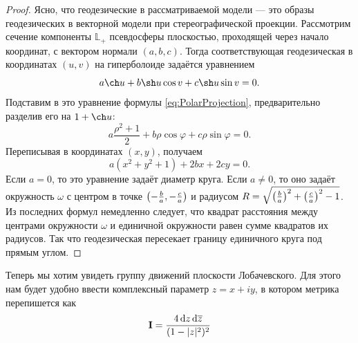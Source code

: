 \begin{proof}
	Ясно, что геодезические в рассматриваемой модели --- это образы геодезических в векторной модели при стереографической проекции. Рассмотрим сечение компоненты $\mathbb{L}_+$ псевдосферы плоскостью, проходящей через начало координат, с вектором нормали $(a, b, c)$. Тогда соответствующая геодезическая в координатах $(u, v)$ на гиперболоиде задаётся уравнением
	\[
		a\ch u + b\sh u\cos v + c\sh u\sin v= 0.
	\]
	Подставим в это уравнение формулы \eqref{eq:PolarProjection}, предварительно разделив его на $1 + \ch u$:
	\[
		a\frac{\rho^2 + 1}{2} + b\rho\cos\varphi + c\rho\sin\varphi = 0.
	\]
	Переписывая в координатах $(x, y)$, получаем
	\[
		a(x^2 + y^2 + 1) + 2bx + 2cy = 0.
	\]
	Если $a = 0$, то это уравнение задаёт диаметр круга. Если $a \ne 0$, то оно задаёт окружность $\omega$ с центром в точке $\left(-\frac{b}{a}, -\frac{c}{a}\right)$ и радиусом $R = \sqrt{\left(\frac{b}{a}\right)^2 + \left(\frac{c}{a}\right)^2 - 1}$. Из последних формул немедленно следует, что квадрат расстояния между центрами окружности $\omega$ и единичной окружности равен сумме квадратов их радиусов. Так что геодезическая пересекает границу единичного круга под прямым углом.
\end{proof}

Теперь мы хотим увидеть группу движений плоскости Лобачевского. Для этого нам будет удобно ввести комплексный параметр $z = x + iy$, в котором метрика перепишется как
\begin{equation} \label{eq:zMetrics}
	\boldsymbol{\operatorname{I}} = \frac{4\mathop{}\!\mathrm{d} z\mathop{}\!\mathrm{d}\overline{z}}{(1 - |z|^2)^2}
\end{equation}

